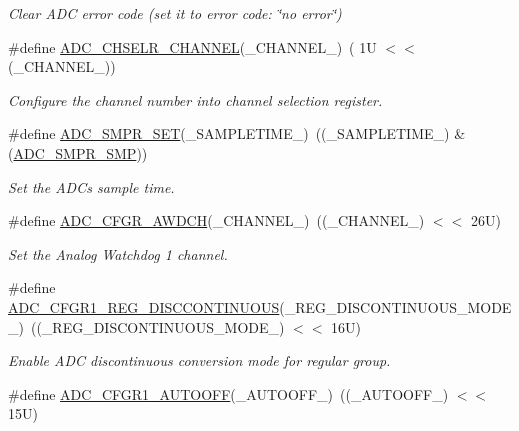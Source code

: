 \begin{DoxyCompactItemize}
\begin{DoxyCompactList}\small\item\em Clear A\+DC error code (set it to error code\+: \char`\"{}no error\char`\"{}) \end{DoxyCompactList}\item 
\#define \hyperlink{group___a_d_c___private___macros_ga5d9a732e25a3c6fda616bd7095d0bcb6}{A\+D\+C\+\_\+\+C\+H\+S\+E\+L\+R\+\_\+\+C\+H\+A\+N\+N\+EL}(\+\_\+\+C\+H\+A\+N\+N\+E\+L\+\_\+)~( 1\+U $<$$<$ (\+\_\+\+C\+H\+A\+N\+N\+E\+L\+\_\+))
\begin{DoxyCompactList}\small\item\em Configure the channel number into channel selection register. \end{DoxyCompactList}\item 
\#define \hyperlink{group___a_d_c___private___macros_ga84692d85aac11c581274b17e74cabc08}{A\+D\+C\+\_\+\+S\+M\+P\+R\+\_\+\+S\+ET}(\+\_\+\+S\+A\+M\+P\+L\+E\+T\+I\+M\+E\+\_\+)~((\+\_\+\+S\+A\+M\+P\+L\+E\+T\+I\+M\+E\+\_\+) \& (\hyperlink{group___peripheral___registers___bits___definition_gaceac2124a2a41388f9f5e5c2c310a27e}{A\+D\+C\+\_\+\+S\+M\+P\+R\+\_\+\+S\+MP}))
\begin{DoxyCompactList}\small\item\em Set the A\+DC\textquotesingle{}s sample time. \end{DoxyCompactList}\item 
\#define \hyperlink{group___a_d_c___private___macros_gaf14fd1def24bda245430287f2c7dbab7}{A\+D\+C\+\_\+\+C\+F\+G\+R\+\_\+\+A\+W\+D\+CH}(\+\_\+\+C\+H\+A\+N\+N\+E\+L\+\_\+)~((\+\_\+\+C\+H\+A\+N\+N\+E\+L\+\_\+) $<$$<$ 26\+U)
\begin{DoxyCompactList}\small\item\em Set the Analog Watchdog 1 channel. \end{DoxyCompactList}\item 
\#define \hyperlink{group___a_d_c___private___macros_gaa0ec9cb0b5d97ba2d8bfd4fdf1f2a398}{A\+D\+C\+\_\+\+C\+F\+G\+R1\+\_\+\+R\+E\+G\+\_\+\+D\+I\+S\+C\+C\+O\+N\+T\+I\+N\+U\+O\+US}(\+\_\+\+R\+E\+G\+\_\+\+D\+I\+S\+C\+O\+N\+T\+I\+N\+U\+O\+U\+S\+\_\+\+M\+O\+D\+E\+\_\+)~((\+\_\+\+R\+E\+G\+\_\+\+D\+I\+S\+C\+O\+N\+T\+I\+N\+U\+O\+U\+S\+\_\+\+M\+O\+D\+E\+\_\+) $<$$<$ 16\+U)
\begin{DoxyCompactList}\small\item\em Enable A\+DC discontinuous conversion mode for regular group. \end{DoxyCompactList}\item 
\#define \hyperlink{group___a_d_c___private___macros_ga36993a7b32f5ec4f4163856f7ba8e8f0}{A\+D\+C\+\_\+\+C\+F\+G\+R1\+\_\+\+A\+U\+T\+O\+O\+FF}(\+\_\+\+A\+U\+T\+O\+O\+F\+F\+\_\+)~((\+\_\+\+A\+U\+T\+O\+O\+F\+F\+\_\+) $<$$<$ 15\+U)

\end{DoxyCompactItemize}

